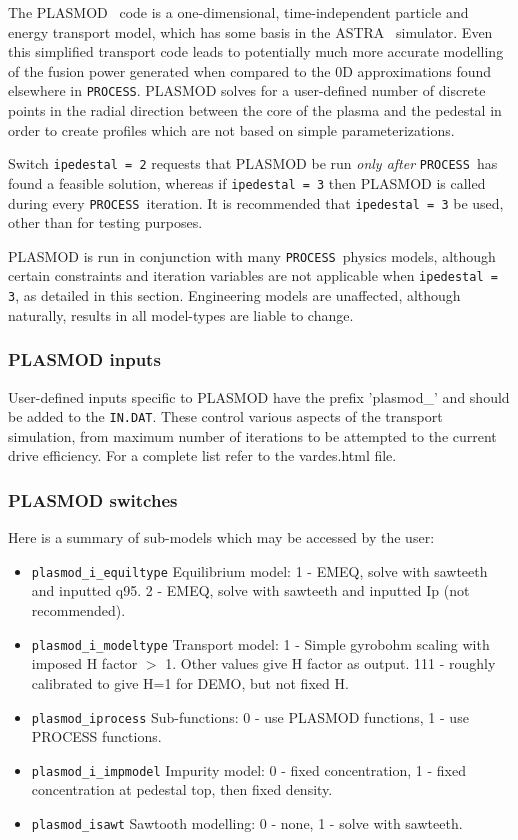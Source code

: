 \documentclass[11pt,a4paper]{report}
\newcommand{\indat}{\mbox{\texttt{IN.DAT}}}
\newcommand{\process}{\mbox{\texttt{PROCESS}}}
\begin{document}
The PLASMOD~\cite{PLASMOD} code is a one-dimensional, time-independent particle and energy transport model, which has some basis in the ASTRA~\cite{ASTRA} simulator. Even this simplified transport code leads to potentially much more accurate modelling of the fusion power generated when compared to the 0D approximations found elsewhere in \process. PLASMOD solves for a user-defined number of discrete points in the radial direction between the core of the plasma and the pedestal in order to create profiles which are not based on simple parameterizations.

Switch \texttt{ipedestal = 2} requests that PLASMOD be run \textit{only after} \process\ has found a feasible solution, whereas if \texttt{ipedestal = 3} then PLASMOD is called during every \process\ iteration. It is recommended that \texttt{ipedestal = 3} be used, other than for testing purposes.

PLASMOD is run in conjunction with many \process\ physics models, although certain constraints and iteration variables are not applicable when \texttt{ipedestal = 3}, as detailed in this section. Engineering models are unaffected, although naturally, results in all model-types are liable to change.

\subsubsection*{PLASMOD inputs}
User-defined inputs specific to PLASMOD have the prefix 'plasmod\_' and should be added to the \indat. These control various aspects of the transport simulation, from maximum number of iterations to be attempted to the current drive efficiency. For a complete list refer to the vardes.html file.

\subsubsection*{PLASMOD switches}
Here is a summary of sub-models which may be accessed by the user:

\begin{itemize}
\item \texttt{plasmod\_i\_equiltype} Equilibrium model: 1 - EMEQ, solve with sawteeth and inputted q95. 2 - EMEQ, solve with sawteeth and inputted Ip (not recommended).
\item \texttt{plasmod\_i\_modeltype} Transport model: 1 - Simple gyrobohm scaling with imposed H factor $>$ 1. Other values give H factor as output. 111 - roughly calibrated to give H=1 for DEMO, but not fixed H.
\item \texttt{plasmod\_iprocess} Sub-functions: 0 - use PLASMOD functions, 1 - use PROCESS functions.
\item \texttt{plasmod\_i\_impmodel} Impurity model: 0 - fixed concentration, 1 - fixed concentration at pedestal top, then fixed density. 
\item \texttt{plasmod\_isawt} Sawtooth modelling: 0 - none, 1 - solve with sawteeth.  
\end{itemize}
\end{document}
